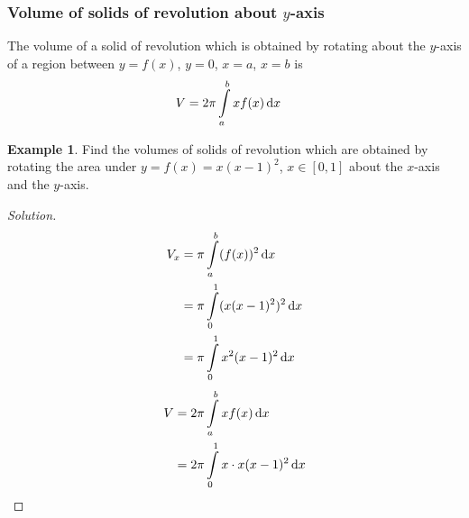 \documentclass[fleqn, a4paper, 12pt]{article}
\theoremstyle{definition}
\newtheorem{example}{Example}
\theoremstyle{theorem}
\theoremstyle{remark}
\newenvironment{solution}
{\begin{proof}[Solution]\let\qed\relax}
	{\end{proof}}
\begin{document}
\subsubsection{Volume of solids of revolution about $y$-axis}

The volume of a solid of revolution which is obtained by rotating about the $y$-axis of a region between $y = f(x)$, $y = 0$, $x = a$, $x = b$ is
\begin{align*}
	V &= 2 \pi \int\limits_{a}^{b} x f(x) \dif x
\end{align*}

\begin{example}
	Find the volumes of solids of revolution which are obtained by rotating the area under $y = f(x) = x(x - 1)^2$, $x \in [0, 1]$ about the $x$-axis and the $y$-axis.
\end{example}

\begin{solution}
	\begin{align*}
		V_x &= \pi \int\limits_{a}^{b} (f(x))^2 \dif x\\
		&= \pi \int\limits_{0}^{1} (x(x-1)^2)^2 \dif x\\
		&= \pi \int\limits_{0}^{1} x^2 (x-1)^2 \dif x
	\end{align*}
	\begin{align*}
		V &= 2 \pi \int\limits_{a}^{b} x f(x) \dif x\\
		&= 2 \pi \int\limits_{0}^{1} x \cdot x (x-1)^2 \dif x
	\end{align*}
\end{solution}
\end{document}
